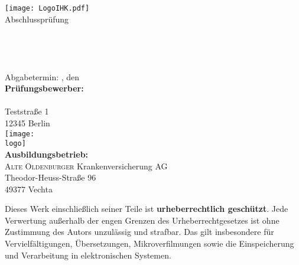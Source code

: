 \thispagestyle{plain}
\begin{titlepage}

\begin{center}
\texttt{[image: LogoIHK.pdf]}\\[1ex]
\Large{Abschlussprüfung \pruefungstermin}\\[3ex]

\Large{\ausbildungsberuf}\\
\LARGE{\betreff}\\[4ex]

\huge{\textbf{\titel}}\\[1.5ex]
\Large{\textbf{\untertitel}}\\[4ex]

\normalsize
Abgabetermin: \ort, den \abgabetermin\\[3em]
\textbf{Prüfungsbewerber:}\\
\autor\\
Teststraße 1\\
12345 Berlin\\[5ex]

\texttt{[image: \\logo]}\\[2ex]
\textbf{Ausbildungsbetrieb:}\\
\textsc{Alte Oldenburger} Krankenversicherung AG\\
Theodor-Heuss-Straße 96\\
49377 Vechta\\[5em]
\end{center}

\small
\noindent
Dieses Werk einschließlich seiner Teile ist \textbf{urheberrechtlich geschützt}. 
Jede Verwertung außerhalb der engen Grenzen des Urheberrechtgesetzes ist ohne 
Zustimmung des Autors unzulässig und strafbar. Das gilt insbesondere für 
Vervielfältigungen, Übersetzungen, Mikroverfilmungen sowie die Einspeicherung 
und Verarbeitung in elektronischen Systemen.

\end{titlepage}